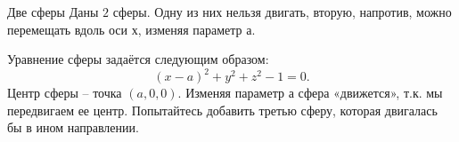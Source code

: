 \begin{surferPage}{Две сферы}
Даны $2$ сферы. Одну из них нельзя двигать, вторую, напротив, можно перемещать вдоль оси $х$, изменяя параметр $а$.

Уравнение сферы задаётся следующим образом:
\[(x-a)^2+y^2+z^2-1=0.\]
Центр сферы – точка $(a,0,0)$. Изменяя параметр а сфера «движется», т.к. мы передвигаем ее центр. Попытайтесь добавить третью сферу, которая двигалась бы в ином направлении.
\end{surferPage}
